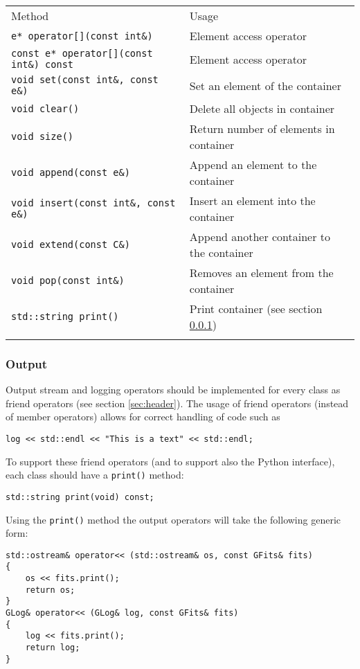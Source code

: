 \documentclass{article}[12pt,a4]
\begin{document}
\begin{center}
\begin{tabular}{ll}
\hline
\hline
\noalign{\smallskip}
Method & Usage \\
\noalign{\smallskip}
\hline
\noalign{\smallskip}
{\tt e* operator[](const int\&)} & Element access operator \\
{\tt const e* operator[](const int\&) const} & Element access operator \\
{\tt void set(const int\&, const e\&)} & Set an element of the container \\
{\tt void clear()} & Delete all objects in container \\
{\tt void size()} & Return number of elements in container \\
{\tt void append(const e\&)} & Append an element to the container \\
{\tt void insert(const int\&, const e\&)} & Insert an element into the container \\
{\tt void extend(const C\&)} & Append another container to the container \\
{\tt void pop(const int\&)} & Removes an element from the container \\
{\tt std::string print()} & Print container (see section \ref{sec:output}) \\
\noalign{\smallskip}
\hline
\end{tabular}
\end{center}


\subsubsection{Output}
\label{sec:output}

Output stream and logging operators should be implemented for every class as friend
operators (see section \ref{sec:header}).
The usage of friend operators (instead of member operators) allows for correct handling
of code such as
\begin{verbatim}
log << std::endl << "This is a text" << std::endl;
\end{verbatim}
To support these friend operators (and to support also the Python interface), each class
should have a {\tt print()} method:
\begin{verbatim}
std::string print(void) const;
\end{verbatim}
Using the {\tt print()} method the output operators will take the following generic form:
\begin{verbatim}
std::ostream& operator<< (std::ostream& os, const GFits& fits)
{
    os << fits.print();
    return os;
}
GLog& operator<< (GLog& log, const GFits& fits)
{
    log << fits.print();
    return log;
}
\end{verbatim}
\end{document}
